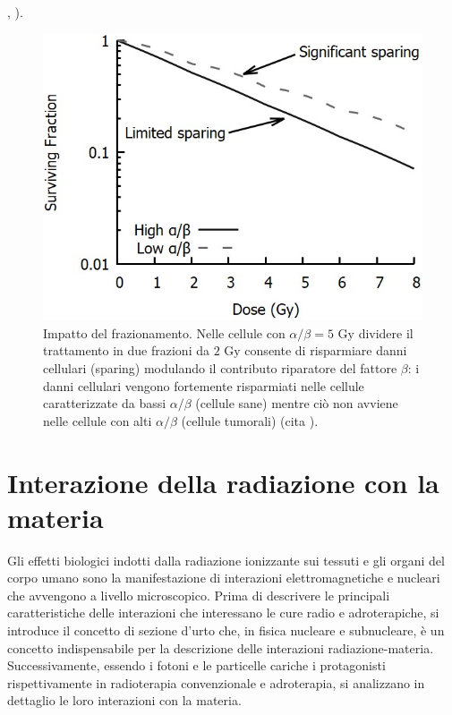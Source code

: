 \documentclass[12pt,a4paper,twoside]{report}
\begin{document}
	,
	).
	\begin{figure}[H]
		\centering
		\includegraphics[width=0.9\linewidth]{sparing.jpg}
		\caption{Impatto del frazionamento. Nelle cellule con $\alpha/\beta=5\mbox{ Gy}$ dividere il trattamento in due frazioni da $2\mbox{ Gy}$ consente di risparmiare danni cellulari (sparing) modulando il contributo riparatore del fattore $\beta$: i danni cellulari vengono fortemente risparmiati nelle cellule caratterizzate da bassi $\alpha/\beta$ (cellule sane) mentre ciò non avviene nelle cellule con alti $\alpha/\beta$ (cellule tumorali) (cita
			).}
		\label{fig:sparing}
	\end{figure}
	
	\section{Interazione della radiazione con la materia}
	Gli effetti biologici indotti dalla radiazione ionizzante sui tessuti e gli organi del corpo umano sono la manifestazione di interazioni elettromagnetiche e nucleari che avvengono a livello microscopico. Prima di descrivere le principali caratteristiche delle interazioni che interessano le cure radio e adroterapiche, si introduce il concetto di sezione d'urto che, in fisica nucleare e subnucleare, è un concetto indispensabile per la descrizione delle interazioni radiazione-materia. Successivamente, essendo i fotoni e le particelle cariche i protagonisti rispettivamente in radioterapia convenzionale e adroterapia, si analizzano in dettaglio le loro interazioni con la materia.
	
\end{document}
